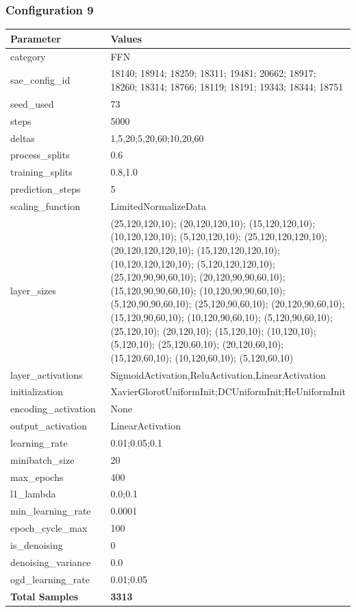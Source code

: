 \documentclass[a4paper,11pt,oneside]{article}
\theoremstyle{plain}
\theoremstyle{definition}
\begin{document}
	\newpage
	\subsubsection{Configuration 9}\label{config9}
	\begin{longtable}[H]{|p{0.3\linewidth}|p{0.7\linewidth}|} \hline 			\rowcolor{beaublue}\textbf{Parameter} &\textbf{Values} \\\hline{category} & {FFN} \\\hline
		{sae\_config\_id} & {18140; 18914; 18259; 18311; 19481; 20662; 18917; 18260; 18314; 18766; 18119; 18191; 19343; 18344; 18751} \\\hline
		{seed\_used} & {73} \\\hline
		{steps} & {5000} \\\hline
		{deltas} & {1,5,20;5,20,60;10,20,60} \\\hline
		{process\_splits} & {0.6} \\\hline
		{training\_splits} & {0.8,1.0} \\\hline
		{prediction\_steps} & {5} \\\hline
		{scaling\_function} & {LimitedNormalizeData} \\\hline
		{layer\_sizes} & {(25,120,120,10); (20,120,120,10); (15,120,120,10); (10,120,120,10); (5,120,120,10); (25,120,120,120,10); (20,120,120,120,10); (15,120,120,120,10); (10,120,120,120,10); (5,120,120,120,10); (25,120,90,90,60,10); (20,120,90,90,60,10); (15,120,90,90,60,10); (10,120,90,90,60,10); (5,120,90,90,60,10); (25,120,90,60,10); (20,120,90,60,10); (15,120,90,60,10); (10,120,90,60,10); (5,120,90,60,10); (25,120,10); (20,120,10); (15,120,10); (10,120,10); (5,120,10); (25,120,60,10); (20,120,60,10); (15,120,60,10); (10,120,60,10); (5,120,60,10)} \\\hline
		{layer\_activations} & {SigmoidActivation,ReluActivation,LinearActivation} \\\hline
		{initialization} & {XavierGlorotUniformInit;DCUniformInit;HeUniformInit} \\\hline
		{encoding\_activation} & {None} \\\hline
		{output\_activation} & {LinearActivation} \\\hline
		{learning\_rate} & {0.01;0.05;0.1} \\\hline
		{minibatch\_size} & {20} \\\hline
		{max\_epochs} & {400} \\\hline
		{l1\_lambda} & {0.0;0.1} \\\hline
		{min\_learning\_rate} & {0.0001} \\\hline
		{epoch\_cycle\_max} & {100} \\\hline
		{is\_denoising} & {0} \\\hline
		{denoising\_variance} & {0.0} \\\hline
		{ogd\_learning\_rate} & {0.01;0.05} \\\hline
		{\textbf{Total Samples}} & {\textbf{3313}} \\\hline
	\end{longtable}
	
\end{document}
